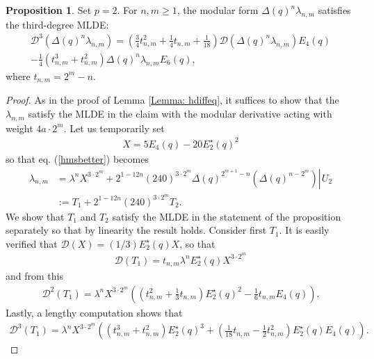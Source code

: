 \documentclass[10pt,a4paper]{amsart}
\numberwithin{equation}{section}
\theoremstyle{definition}
\newtheorem{Prop}[Th]{Proposition}
\newcommand{\haupt}{\lambda}
\newcommand{\utwo}[1]{\left. #1 \right\rvert \hspace{1pt} U_{2}}
\begin{document}
\begin{Prop} \label{Prop: hmdiffs}
    Set $p=2$. For $n,m \geq 1$, the modular form $\Delta (q)^{n} \haupt_{n,m}$ satisfies the third-degree MLDE:
    \begin{multline}
        \mathcal{D}^{3} ( \Delta (q)^{n} \haupt_{n,m}) = \left( \frac{3}{4}t_{n,m}^{2} + \frac{1}{4}t_{n,m} + \frac{1}{18} \right) \mathcal{D}(\Delta (q)^{n} \haupt_{n,m}) E_{4}(q) \\ - \frac{1}{4} \left( t_{n,m}^{3} + t_{n,m}^{2} \right) \Delta (q)^{n}\haupt_{n,m} E_{6}(q),
    \end{multline}
    where $t_{n,m} = 2^{m}-n$.
\end{Prop}
\begin{proof}
    As in the proof of Lemma \ref{Lemma: hdiffeq}, it suffices to show that the $\haupt_{n,m}$ satisfy the MLDE in the claim with the modular derivative acting with weight $4a \cdot 2^{m}$. Let us temporarily set
   \begin{align*}
       X = 5E_{4}(q) - 20 E_{2}^{\star}(q)^{2}
   \end{align*}
   so that eq. (\ref{hmsbetter}) becomes
   \begin{align*}
        \haupt_{n,m} &= \haupt^{n}  X^{3 \cdot 2^{m}} + 2^{1 - 12n} (240)^{3 \cdot 2^{m}} \Delta (q)^{2^{m+1}-n} \utwo{ \left( \Delta (q)^{n-2^{m}} \right) } \\
        &:= T_{1} + 2^{1-12n} (240)^{3 \cdot 2^{m}}  T_{2}.
   \end{align*}
   We show that $T_{1}$ and $T_{2}$ satisfy the MLDE in the statement of the proposition separately so that by linearity the result holds. Consider first $T_{1}$. It is easily verified that $\mathcal{D}(X) = (1/3)E_{2}^{\star}(q)X$, so that
   \begin{align}
       \mathcal{D}(T_{1}) = t_{n,m} \haupt^{n} E_{2}^{\star}(q) X^{3 \cdot 2^{m}} \label{T1d1}
   \end{align}
   and from this
   \begin{align*}
       \mathcal{D}^{2}(T_{1}) = \haupt^{n} X^{3 \cdot 2^{m}} \left( \left( t_{n,m}^{2} + \frac{1}{3} t_{n,m} \right) E_{2}^{\star}(q)^{2} - \frac{1}{6} t_{n,m} E_{4}(q) \right).
   \end{align*}
   Lastly, a lengthy computation shows that
   \begin{align*}
       \mathcal{D}^{3}(T_{1}) = \haupt^{n}X^{3 \cdot 2^{m}} \left( \left( t_{n,m}^{3} + t_{n,m}^{2} \right) E_{2}^{\star}(q)^{3} + \left( \frac{1}{18} t_{n,m} - \frac{1}{2} t_{n,m}^{2} \right) E_{2}^{\star}(q)E_{4}(q) \right).

\end{align*}
\end{proof}
\end{document}
